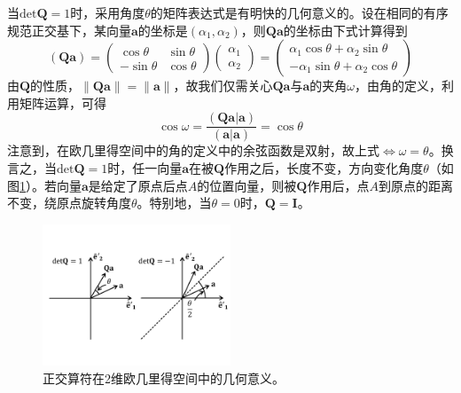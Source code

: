 \documentclass[main.tex]{subfiles}
\begin{document}
当$\mathrm{det}\mathbf{Q}=1$时，采用角度$\theta$的矩阵表达式是有明快的几何意义的。设在相同的有序规范正交基下，某向量$\mathbf{a}$的坐标是$\left(\alpha_1,\alpha_2\right)$，则$\mathbf{Qa}$的坐标由下式计算得到
\[\left(\mathbf{Qa}\right)=\left(\begin{array}{cc}\cos\theta&\sin\theta\\-\sin\theta&\cos\theta\end{array}\right)\left(\begin{array}{c}\alpha_1\\\alpha_2\end{array}\right)=\left(\begin{array}{c}\alpha_1\cos\theta+\alpha_2\sin\theta\\-\alpha_1\sin\theta+\alpha_2\cos\theta\end{array}\right)\]
由$\mathbf{Q}$的性质，$\left\|\mathbf{Qa}\right\|=\left\|\mathbf{a}\right\|$，故我们仅需关心$\mathbf{Qa}$与$\mathbf{a}$的夹角$\omega$，由角的定义，利用矩阵运算，可得
\[
    \cos\omega=\frac{\left(\mathbf{Qa}|\mathbf{a}\right)}{\left(\mathbf{a}|\mathbf{a}\right)}=\cos\theta
\]
注意到，在欧几里得空间中的角的定义中的余弦函数是双射，故上式$\Leftrightarrow\omega=\theta$。换言之，当$\mathrm{det}\mathbf{Q}=1$时，任一向量$\mathbf{a}$在被$\mathbf{Q}$作用之后，长度不变，方向变化角度$\theta$（如图\ref{fig:II.3.1}）。若向量$\mathbf{a}$是给定了原点后点$A$的位置向量，则被$\mathbf{Q}$作用后，点$A$到原点的距离不变，绕原点旋转角度$\theta$。特别地，当$\theta=0$时，$\mathbf{Q}=\mathbf{I}$。

\begin{figure}[h]
    \centering
    \includegraphics[width=0.5\textwidth]{images/II.3.1.pdf}
    \caption{正交算符在2维欧几里得空间中的几何意义。}
    \label{fig:II.3.1}
\end{figure}
\end{document}
